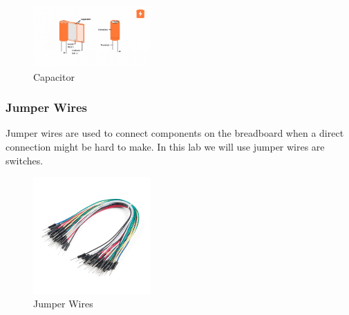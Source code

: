 \documentclass[a4paper, 10pt]{article}
\begin{document}
				\begin{figure}[h!]
					\centering
					\includegraphics[width=0.4\textwidth]{./images/basics-capacitor-thumbnail.png}
					\caption{Capacitor}
					\label{fig:capacitor}
				\end{figure}

				\pagebreak
			\subsubsection{Jumper Wires}
				Jumper wires are used to connect components on the breadboard when a direct connection might be hard to make. 
				In this lab we will use jumper wires are switches.\\

				\begin{figure}[h!]
					\centering
					\includegraphics[width=0.4\textwidth]{./images/JumperWires.jpeg}
					\caption{Jumper Wires}
					\label{fig:jumper_wires}
				\end{figure}

				
\end{document}
